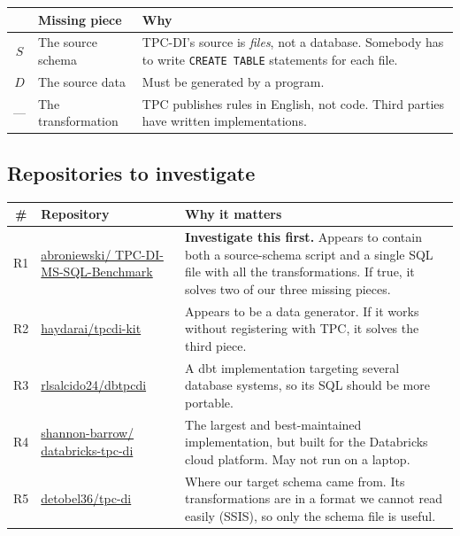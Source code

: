 \documentclass[11pt,a4paper]{article}
\newcommand{\code}[1]{\texttt{\small #1}}
\begin{document}
\begin{center}
\begin{tabular}{@{}cL{5.2cm}L{8.0cm}@{}}
\toprule
& \textbf{Missing piece} & \textbf{Why} \\
\midrule
$S$ & The source schema & TPC-DI's source is \emph{files}, not a database. Somebody has to write \code{CREATE TABLE} statements for each file. \\
$D$ & The source data & Must be generated by a program. \\
--- & The transformation & TPC publishes rules in English, not code. Third parties have written implementations. \\
\bottomrule
\end{tabular}
\end{center}

\subsection{Repositories to investigate}

\begin{center}
\small
\begin{tabular}{@{}cL{4.6cm}L{8.6cm}@{}}
\toprule
\textbf{\#} & \textbf{Repository} & \textbf{Why it matters} \\
\midrule
R1 & \href{https://github.com/abroniewski/TPC-DI-MS-SQL-Benchmark}{abroniewski/ TPC-DI-MS-SQL-Benchmark} & \textbf{Investigate this first.} Appears to contain both a source-schema script and a single SQL file with all the transformations. If true, it solves two of our three missing pieces. \\
\addlinespace[2pt]
R2 & \href{https://github.com/haydarai/tpcdi-kit}{haydarai/tpcdi-kit} & Appears to be a data generator. If it works without registering with TPC, it solves the third piece. \\
\addlinespace[2pt]
R3 & \href{https://github.com/rlsalcido24/dbtpcdi}{rlsalcido24/dbtpcdi} & A dbt implementation targeting several database systems, so its SQL should be more portable. \\
\addlinespace[2pt]
R4 & \href{https://github.com/shannon-barrow/databricks-tpc-di}{shannon-barrow/ databricks-tpc-di} & The largest and best-maintained implementation, but built for the Databricks cloud platform. May not run on a laptop. \\
\addlinespace[2pt]
R5 & \href{https://github.com/detobel36/tpc-di}{detobel36/tpc-di} & Where our target schema came from. Its transformations are in a format we cannot read easily (SSIS), so only the schema file is useful. \\
\bottomrule
\end{tabular}
\end{center}
\end{document}
